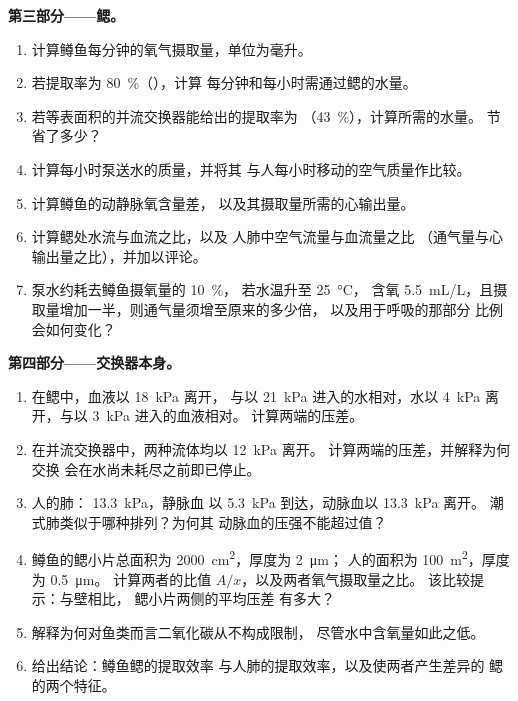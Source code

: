 \begin{problem}
\medskip
\noindent\textbf{第三部分——鳃。}
\begin{enumerate}[resume]
  \item 计算鳟鱼每分钟的氧气摄取量，单位为毫升。
  \item 若提取率为 \qty{80}{\%}（），计算
        每分钟和每小时需通过鳃的水量。
  \item 若等表面积的并流交换器能给出的提取率为
        （\qty{43}{\%}），计算所需的水量。
        节省了多少？
  \item 计算每小时泵送水的质量，并将其
        与人每小时移动的空气质量作比较。
  \item 计算鳟鱼的动静脉氧含量差，
        以及其摄取量所需的心输出量。
  \item 计算鳃处水流与血流之比，以及
        人肺中空气流量与血流量之比
        （通气量与心输出量之比），并加以评论。
  \item 泵水约耗去鳟鱼摄氧量的 \qty{10}{\%}，
        若水温升至 \qty{25}{\celsius}，
        含氧 \qty{5.5}{mL/L}，且摄取量增加一半，则通气量须增至原来的多少倍，
        以及用于呼吸的那部分
        比例会如何变化？
\end{enumerate}

\medskip
\noindent\textbf{第四部分——交换器本身。}
\begin{enumerate}[resume]
  \item 在鳃中，血液以 \qty{18}{kPa} 离开，
        与以 \qty{21}{kPa} 进入的水相对，水以
        \qty{4}{kPa} 离开，与以 \qty{3}{kPa} 进入的血液相对。
        计算两端的压差。
  \item 在并流交换器中，两种流体均以 \qty{12}{kPa} 离开。
        计算两端的压差，并解释为何交换
        会在水尚未耗尽之前即已停止。
  \item 人的肺： \qty{13.3}{kPa}，静脉血
        以 \qty{5.3}{kPa} 到达，动脉血以 \qty{13.3}{kPa} 离开。
        潮式肺类似于哪种排列？为何其
        动脉血的压强不能超过值？
  \item 鳟鱼的鳃小片总面积为 \qty{2000}{cm^2}，厚度为 \qty{2}{\micro m}；
        人的面积为 \qty{100}{m^2}，厚度为 \qty{0.5}{\micro m}。
        计算两者的比值 $A/x$，以及两者氧气摄取量之比。
        该比较提示：与壁相比，
        鳃小片两侧的平均压差
        有多大？
  \item 解释为何对鱼类而言二氧化碳从不构成限制，
        尽管水中含氧量如此之低。
  \item 给出结论：鳟鱼鳃的提取效率
        与人肺的提取效率，以及使两者产生差异的
        鳃的两个特征。
\end{enumerate}
\end{problem}
